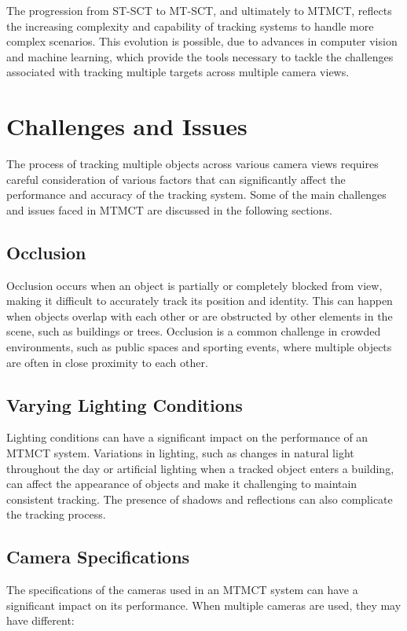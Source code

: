 The progression from ST-SCT to MT-SCT, and ultimately to MTMCT, reflects the increasing complexity and capability of tracking systems to handle more complex scenarios. This evolution is possible, due to advances in computer vision and machine learning, which provide the tools necessary to tackle the challenges associated with tracking multiple targets across multiple camera views.

\section{Challenges and Issues}\label{sec:challenges_and_issues}
The process of tracking multiple objects across various camera views requires careful consideration of various factors that can significantly affect the performance and accuracy of the tracking system. Some of the main challenges and issues faced in MTMCT are discussed in the following sections.

\subsection{Occlusion}\label{subsec:occlusion}
Occlusion occurs when an object is partially or completely blocked from view, making it difficult to accurately track its position and identity. This can happen when objects overlap with each other or are obstructed by other elements in the scene, such as buildings or trees. Occlusion is a common challenge in crowded environments, such as public spaces and sporting events, where multiple objects are often in close proximity to each other.

\subsection{Varying Lighting Conditions}\label{subsec:varying_lighting_conditions}
Lighting conditions can have a significant impact on the performance of an MTMCT system. Variations in lighting, such as changes in natural light throughout the day or artificial lighting when a tracked object enters a building, can affect the appearance of objects and make it challenging to maintain consistent tracking. The presence of shadows and reflections can also complicate the tracking process.

\subsection{Camera Specifications}\label{subsec:camera_specification}
The specifications of the cameras used in an MTMCT system can have a significant impact on its performance. When multiple cameras are used, they may have different:

